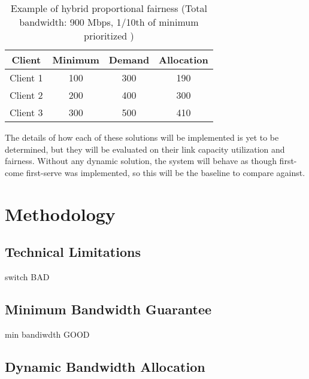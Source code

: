 \documentclass[accepted,single]{gipaper}
\begin{document}
\begin{table}[h]
	\label{hybrid_table}
	\vspace{-3mm}
	\begin{center}
		\begin{small}
			\begin{tabular}{cccc}
				Client & Minimum & Demand & Allocation \\
				\hline
				Client 1 & 100 & 300 & 190 \\
				Client 2 & 200 & 400 & 300 \\
				Client 3 & 300 & 500 & 410 \\
			\end{tabular}
		\end{small}
	\end{center}
	\caption{Example of hybrid proportional fairness (Total bandwidth: 900 Mbps, 1/10th of minimum prioritized )}
	\vspace{-3mm}
\end{table}
\fi

The details of how each of these solutions will be implemented is yet to be determined, but they will be evaluated on their link capacity utilization and fairness. Without any dynamic solution, the system will behave as though first-come first-serve was implemented, so this will be the baseline to compare against.


\section{Methodology}
\label{methodology}

\subsection{Technical Limitations}
\label{tech_limitations}

switch BAD

\subsection{Minimum Bandwidth Guarantee}
\label{min_bandwidth}

min bandiwdth GOOD

\subsection{Dynamic Bandwidth Allocation}
\label{min_bandwidth}
\end{document}
